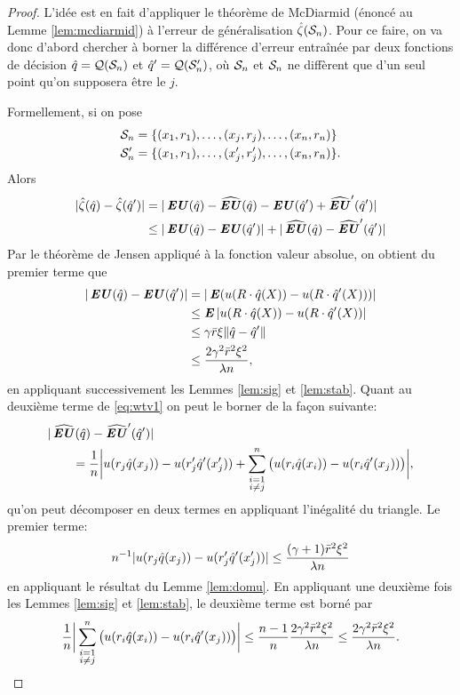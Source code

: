 \begin{proof}
  L'idée est en fait d'appliquer le théorème de McDiarmid (énoncé au Lemme
  \ref{lem:mcdiarmid}) à l'erreur de généralisation $\hat\zeta(\S_n)$. Pour ce faire, on va
  donc d'abord chercher à borner la différence d'erreur entraînée par deux fonctions de
  décision $\qh = \alg(\S_n)$ et $\qh' = \alg(\S_n')$, où $\S_n$ et $\S_n$ ne diffèrent
  que d'un seul point qu'on supposera être le $j$\ieme.

  Formellement, si on pose
  \begin{align}
    \S_n &= \{(x_1,r_1),\ldots,(x_j,r_j),\ldots,(x_n,r_n)\}\\
    \S_n' &= \{(x_1,r_1),\ldots,(x'_j,r'_j),\ldots,(x_n,r_n)\}.
  \end{align}
  Alors
  \begin{align}
    |\hat\zeta(\qh) - \hat\zeta(\qh')| &= |\EU(\qh) - \hEU(\qh) -\EU(\qh') + \hEU'(\qh')|\\
                               &\leq |\EU(\qh) - \EU(\qh')| + |\hEU(\qh) - \hEU'(\qh')|\label{eq:wtv1}
  \end{align}
  Par le théorème de Jensen appliqué à la fonction valeur absolue, on obtient du premier
  terme que
  \begin{align}
    |\EU(\qh) - \EU(\qh')| &= |\E(u(R\cdot\qh(X)) - u(R\cdot\qh'(X)))|\\
                           &\leq \E|u(R\cdot\qh(X)) - u(R\cdot\qh'(X))|\\
                           &\leq \gamma\rmax\xi\|\qh-\qh'\|\\
                           &\leq \frac{2\gamma^2\rmax^2\xi^2}{\lambda n},
  \end{align}
  en appliquant successivement les Lemmes \ref{lem:sig} et \ref{lem:stab}. Quant au
  deuxième terme de \eqref{eq:wtv1} on peut le borner de la façon suivante:
  \begin{align}
    &|\hEU(\qh) - \hEU'(\qh')|\nonumber\\
    &\qquad = \frac{1}{n}\bigg|u(r_j\qh(x_j)) - u(r_j'\qh'(x_j')) + \sum_{\substack{i=1\\i\neq
    j}}^n\big(u(r_i\qh(x_i)) - u(r_i\qh'(x_j))\big)\bigg|,
  \end{align}
  qu'on peut décomposer en deux termes en appliquant l'inégalité du triangle. Le premier
  terme:
  \begin{equation}
    n^{-1}|u(r_j\qh(x_j)) - u(r_j'\qh'(x_j'))| \leq \frac{(\gamma+1)\rmax^2\xi^2}{\lambda n}
  \end{equation}
  en appliquant le résultat du Lemme \ref{lem:domu}. En appliquant une deuxième fois les
  Lemmes \ref{lem:sig} et \ref{lem:stab}, le deuxième terme est borné par
  \begin{equation}
    \frac{1}{n}\bigg|\sum_{\substack{i=1\\i \neq j}}^n\big(u(r_i\qh(x_i)) -
    u(r_i\qh'(x_j))\big)\bigg| \leq \frac{n-1}{n}\frac{2\gamma^2\rmax^2\xi^2}{\lambda n} \leq \frac{2\gamma^2\rmax^2\xi^2}{\lambda n}.
  \end{equation}


\end{proof}
